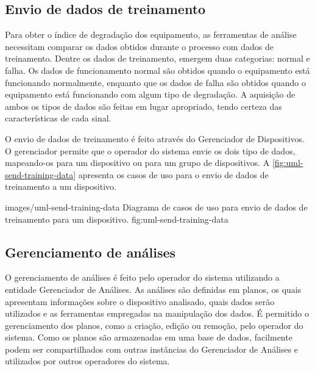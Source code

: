 \iffalse
A \cref{fig:device-send-behavior} ilustra o envio de novos comportamentos pelo operador do sistema
para um dispositivo. O dispositivo mantém uma lista de comportamentos e seleciona qual o mais
adequado para a situação corrente. A situação é definida pelo nível de saúde obtido através das
análises de dados e representa a degradação de todo ou parte do equipamento.

\includefiguretmp
  {Envio de comportamentos para o dispositivo.}
  {fig:device-send-behavior}
\fi

\subsection{Envio de dados de treinamento}

Para obter o índice de degradação dos equipamento, as ferramentas de análise necessitam comparar os
dados obtidos durante o processo com dados de treinamento. Dentre os dados de treinamento, emergem
duas categorias: normal e falha. Os dados de funcionamento normal são obtidos quando o equipamento
está funcionando normalmente, enquanto que os dados de falha são obtidos quando o equipamento está
funcionando com algum tipo de degradação. A aquisição de ambos os tipos de dados são feitas em lugar
apropriado, tendo certeza das características de cada sinal.

O envio de dados de treinamento é feito através do Gerenciador de Dispositivos. O gerenciador
permite que o operador do sistema envie os dois tipo de dados, mapeando-os para um dispositivo ou
para um grupo de dispositivos. A \cref{fig:uml-send-training-data} apresenta os casos de uso para o
envio de dados de treinamento a um dispositivo.

  {images/uml-send-training-data}
  {Diagrama de casos de uso para envio de dados de treinamento para um dispositivo.}
  {fig:uml-send-training-data}


\subsection{Gerenciamento de análises}

O gerenciamento de análises é feito pelo operador do sistema utilizando a entidade Gerenciador de
Análises. As análises são definidas em planos, os quais apresentam informações sobre o dispositivo
analisado, quais dados serão utilizados e as ferramentas empregadas na manipulação dos dados. É
permitido o gerenciamento dos planos, como a criação, edição ou remoção, pelo operador do sistema.
Como os planos são armazenadas em uma base de dados, facilmente podem ser compartilhados com outras
instâncias do Gerenciador de Análises e utilizados por outros operadores do sistema.

